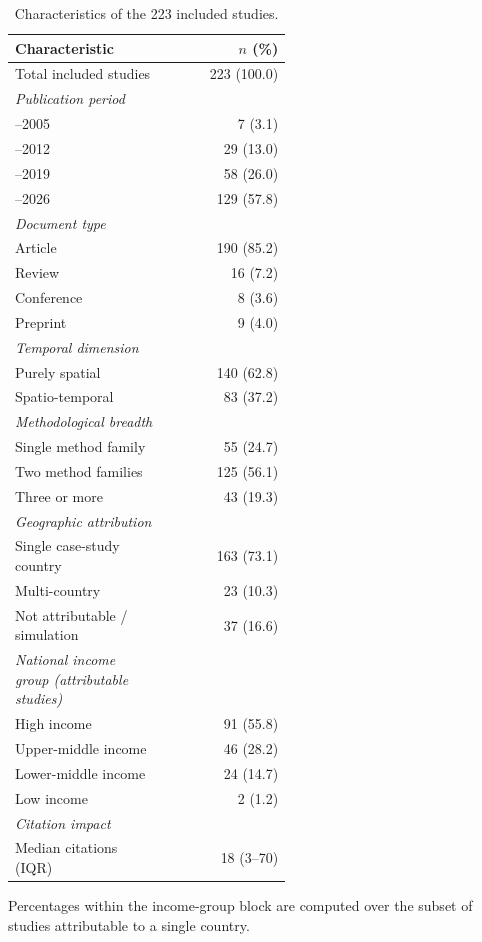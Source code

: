 \begin{table}[htbp]
\centering
\footnotesize
\caption{Characteristics of the 223 included studies.}
\label{tab:characteristics}
\begin{tabular}{p{0.55\linewidth}r}
\toprule
Characteristic & $n$ (\%) \\
\midrule
Total included studies & 223 (100.0) \\
\textit{Publication period} &  \\
\quad 1977--2005 & 7 (3.1) \\
\quad 2006--2012 & 29 (13.0) \\
\quad 2013--2019 & 58 (26.0) \\
\quad 2020--2026 & 129 (57.8) \\
\textit{Document type} &  \\
\quad Article & 190 (85.2) \\
\quad Review & 16 (7.2) \\
\quad Conference & 8 (3.6) \\
\quad Preprint & 9 (4.0) \\
\textit{Temporal dimension} &  \\
\quad Purely spatial & 140 (62.8) \\
\quad Spatio-temporal & 83 (37.2) \\
\textit{Methodological breadth} &  \\
\quad Single method family & 55 (24.7) \\
\quad Two method families & 125 (56.1) \\
\quad Three or more & 43 (19.3) \\
\textit{Geographic attribution} &  \\
\quad Single case-study country & 163 (73.1) \\
\quad Multi-country & 23 (10.3) \\
\quad Not attributable / simulation & 37 (16.6) \\
\textit{National income group (attributable studies)} &  \\
\quad High income & 91 (55.8) \\
\quad Upper-middle income & 46 (28.2) \\
\quad Lower-middle income & 24 (14.7) \\
\quad Low income & 2 (1.2) \\
\textit{Citation impact} &  \\
\quad Median citations (IQR) & 18 (3--70) \\
\bottomrule
\end{tabular}
\begin{minipage}{\linewidth}\vspace{4pt}\scriptsize Percentages within the income-group block are computed over the subset of studies attributable to a single country.\end{minipage}
\end{table}

